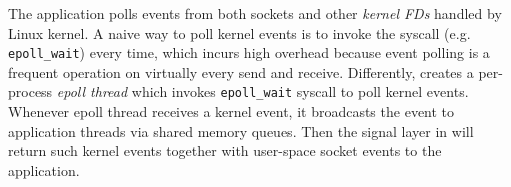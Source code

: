 The application polls events from both sockets and other \textit{kernel FDs} handled by Linux kernel.
A naive way to poll kernel events is to invoke the syscall (e.g. \texttt{epoll\_wait}) every time, which incurs high overhead because event polling is a frequent operation on virtually every send and receive.
Differently, \libipc{} creates a per-process \textit{epoll thread} which invokes \texttt{epoll\_wait} syscall to poll kernel events. Whenever epoll thread receives a kernel event, it broadcasts the event to application threads via shared memory queues. Then the signal layer in \libipc{} will return such kernel events together with user-space socket events to the application.

